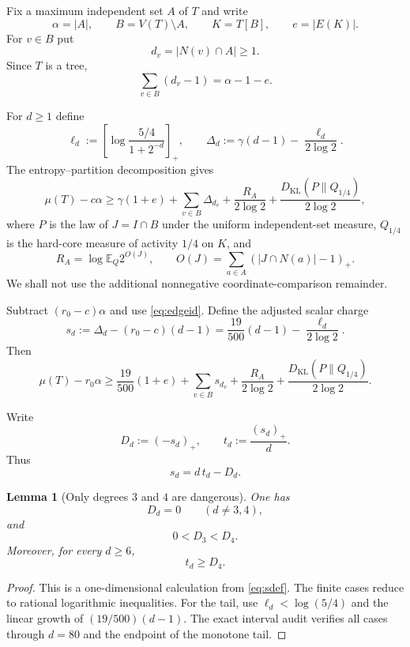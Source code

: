 \documentclass[11pt]{article}
\newtheorem{lemma}[theorem]{Lemma}
\newcommand{\E}{\mathbb E}
\begin{document}
Fix a maximum independent set $A$ of $T$ and write
\[
 \alpha=|A|,
 \qquad B=V(T)\setminus A,
 \qquad K=T[B],
 \qquad e=|E(K)|.
\]
For $v\in B$ put
\[
 d_v=|N(v)\cap A|\ge1.
\]
Since $T$ is a tree,
\begin{equation}\label{eq:edgeid}
 \sum_{v\in B}(d_v-1)=\alpha-1-e.
\end{equation}

For $d\ge1$ define
\[
 \ell_d:=\left[\log\frac{5/4}{1+2^{-d}}\right]_+,
 \qquad
 \Delta_d:=\gamma(d-1)-\frac{\ell_d}{2\log2}.
\]
The entropy--partition decomposition gives
\begin{equation}\label{eq:oldmaster}
 \mu(T)-c\alpha
 \ge
 \gamma(1+e)+\sum_{v\in B}\Delta_{d_v}
 +\frac{R_A}{2\log2}
 +\frac{D_{\mathrm{KL}}(P\|Q_{1/4})}{2\log2},
\end{equation}
where $P$ is the law of $J=I\cap B$ under the uniform independent-set measure, $Q_{1/4}$ is the hard-core measure of activity $1/4$ on $K$, and
\[
 R_A=\log\E_Q 2^{O(J)},
 \qquad
 O(J)=\sum_{a\in A}(|J\cap N(a)|-1)_+.
\]
We shall not use the additional nonnegative coordinate-comparison remainder.

Subtract $(r_0-c)\alpha$ and use \eqref{eq:edgeid}.  Define the adjusted scalar charge
\begin{equation}\label{eq:sdef}
 s_d
 :=\Delta_d-(r_0-c)(d-1)
 =\frac{19}{500}(d-1)-\frac{\ell_d}{2\log2}.
\end{equation}
Then
\begin{equation}\label{eq:master}
 \mu(T)-r_0\alpha
 \ge
 \frac{19}{500}(1+e)
 +\sum_{v\in B}s_{d_v}
 +\frac{R_A}{2\log2}
 +\frac{D_{\mathrm{KL}}(P\|Q_{1/4})}{2\log2}.
\end{equation}

Write
\[
 D_d:=(-s_d)_+,
 \qquad
 t_d:=\frac{(s_d)_+}{d}.
\]
Thus
\begin{equation}\label{eq:splitcharge}
 s_d=d\,t_d-D_d.
\end{equation}

\begin{lemma}[Only degrees $3$ and $4$ are dangerous]\label{lem:scalar}
One has
\[
 D_d=0\qquad(d\ne3,4),
\]
and
\[
 0<D_3<D_4.
\]
Moreover, for every $d\ge6$,
\[
 t_d\ge D_4.
\]
\end{lemma}

\begin{proof}
This is a one-dimensional calculation from \eqref{eq:sdef}.  The finite cases reduce to rational logarithmic inequalities.  For the tail, use
$\ell_d<\log(5/4)$ and the linear growth of $(19/500)(d-1)$.  The exact interval audit verifies all cases through $d=80$ and the endpoint of the monotone tail.
\end{proof}
\end{document}
